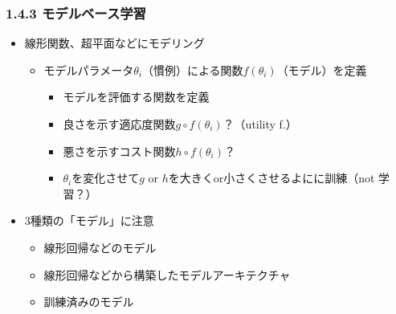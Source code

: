 \documentclass[aspectratio=169, dvipdfmx, 14pt, xcolor={svgnames,dvipsnames}]{beamer}
\def\tightlist{\itemsep1pt\parskip0pt\parsep0pt}
\begin{document}
\begin{frame}
  \frametitle{1.4.3 モデルベース学習}
  \begin{itemize}
    \tightlist
    \item
          線形関数、超平面などにモデリング

          \begin{itemize}
            \tightlist
            \item
                  モデルパラメータ$\theta_i$（慣例）による関数$f(\theta_i)$（モデル）を定義

                  \begin{itemize}
                    \tightlist
                    \item
                          モデルを評価する関数を定義

                    \item
                          良さを示す適応度関数$g \circ f(\theta_i)$？（utility f.）
                    \item
                          悪さを示すコスト関数$h \circ f(\theta_i)$？
                    \item
                          $\theta_i$を変化させて$g$ or $h$を大きくor小さくさせるよにに訓練（not
                          学習？）
                  \end{itemize}
          \end{itemize}
    \item
          3種類の「モデル」に注意

          \begin{itemize}
            \tightlist
            \item
                  線形回帰などのモデル
            \item
                  線形回帰などから構築したモデルアーキテクチャ
            \item
                  訓練済みのモデル
          \end{itemize}
  \end{itemize}
\end{frame}

\end{document}
